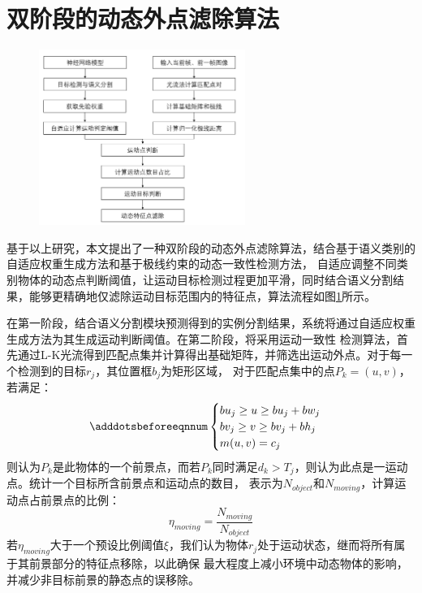 \section{双阶段的动态外点滤除算法}
\begin{figure}[!htbp]
    \centering
    \includegraphics[width=0.6\textwidth]{Img/3-filterflow.png}
    \label{fig:filterflow}
\end{figure}
基于以上研究，本文提出了一种双阶段的动态外点滤除算法，结合基于语义类别的自适应权重生成方法和基于极线约束的动态一致性检测方法，
自适应调整不同类别物体的动态点判断阈值，让运动目标检测过程更加平滑，同时结合语义分割结果，能够更精确地仅滤除运动目标范围内的特征点，算法流程如图\ref{fig:filterflow}所示。

在第一阶段，结合语义分割模块预测得到的实例分割结果，系统将通过自适应权重生成方法为其生成运动判断阈值。在第二阶段，将采用运动一致性
检测算法，首先通过L-K光流得到匹配点集并计算得出基础矩阵，并筛选出运动外点。对于每一个检测到的目标$r_{j}$，其位置框$b_{j}$为矩形区域，
对于匹配点集中的点$P_{k}=(u,v)$，若满足：
\begin{equation} 
    \adddotsbeforeeqnnum%
    \begin{cases}
        bu_{j}\geq u\geq bu_{j}+bw_{j}\\
        bv_{j}\geq v\geq bv_{j}+bh_{j}\\
        m(u,v)=c_{j}\\ 
    \end{cases}
\end{equation}
则认为$P_{k}$是此物体的一个前景点，而若$P_{k}$同时满足$d_{k}>T_{j}$，则认为此点是一运动点。统计一个目标所含前景点和运动点的数目，
表示为$N_{object}$和$N_{moving}$，计算运动点占前景点的比例：
$$\eta_{moving}=\frac{N_{moving}}{N_{object}}$$
若$\eta_{moving}$大于一个预设比例阈值$\xi$，我们认为物体$r_{j}$处于运动状态，继而将所有属于其前景部分的特征点移除，以此确保
最大程度上减小环境中动态物体的影响，并减少非目标前景的静态点的误移除。

